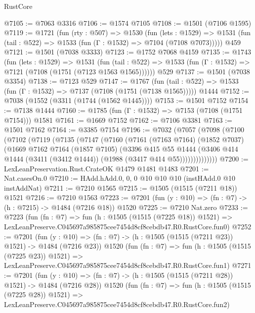 \begin{lexlean}{RustCore}
\begin{coremodule}
@7105 := @7063 @3316
@7106 := @1574 @7105
@7108 := @1501 (@7106 @1595)
@7119 := @1721
    (fun (rty : @507) =>
    @1530
      (fun (lets : @1529) =>
      @1531 (fun (tail : @522) => @1533 (fun (Γ : @1532) => @7104 (@7108 @7073)))))
    @459
@7121 := @1501 (@7038 @3333)
@7123 := @1752 @7068 @4159
@7135 := @1743
    (fun (lets : @1529) =>
    @1531
      (fun (tail : @522) => @1533 (fun (Γ : @1532) => @7121 (@7108 (@1751 (@7123 @1563 @1565))))))
    @529
@7137 := @1501 (@7038 @3354)
@7138 := @7123 @529
@7147 := @1767
    (fun (tail : @522) => @1533 (fun (Γ : @1532) => @7137 (@7108 (@1751 (@7138 @1565)))))
    @1444
@7152 := @7038 (@1552 (@3311 (@1744 (@1562 @1445))))
@7153 := @1501 @7152
@7154 := @7138 @1444
@7160 := @1785 (fun (Γ : @1532) => @7153 (@7108 (@1751 @7154))) @1581
@7161 := @1669 @7152
@7162 := @7106 @3381
@7163 := @1501 @7162
@7164 := @3385 @7154
@7196 := @7032
    (@7057
      (@7098
        (@7100
          (@7102
            (@7119
              (@7135
                (@7147
                  (@7160
                    (@7161
                      (@7163 @7164)
                      (@1852 @7037)
                      (@1669
                        @7162
                        @7164
                        (@1857 @7105)
                        (@3396
                          @415
                          @55
                          @1444
                          (@3406
                            @414
                            @1444
                            (@3411 (@3412 @1444))
                            (@1988 (@3417 @414 @55))))))))))))))
@7200 := LexLeanPreservation.Rust.CrateOK @1479 @1481 @1483
@7201 := Nat.casesOn.{0}
@7210 := HAdd.hAdd.{0, 0, 0} @10 @10 @10 (instHAdd.{0} @10 instAddNat)
@7211 := @7210 @1565
@7215 := @1505 (@1515 (@7211 @18)) @1521
@7216 := @7210 @1563
@7223 := @7201 (fun (y : @10) => (fn : @7) -> (h : @7215) -> @1484 (@7216 @18)) @1520
@7225 := @7210 Nat.zero
@7233 := @7223
    (fun (fn : @7) =>
    fun (h : @1505 (@1515 (@7225 @18)) @1521) =>
    LexLeanPreserve.C045697a985875cee7454d8cf8cebdb47.R0.RustCore.fun0)
@7252 := @7201
    (fun (y : @10) => (fn : @7) -> (h : @1505 (@1515 (@7211 @23)) @1521) -> @1484 (@7216 @23))
    @1520
    (fun (fn : @7) =>
    fun (h : @1505 (@1515 (@7225 @23)) @1521) =>
    LexLeanPreserve.C045697a985875cee7454d8cf8cebdb47.R0.RustCore.fun1)
@7271 := @7201
    (fun (y : @10) => (fn : @7) -> (h : @1505 (@1515 (@7211 @28)) @1521) -> @1484 (@7216 @28))
    @1520
    (fun (fn : @7) =>
    fun (h : @1505 (@1515 (@7225 @28)) @1521) =>
    LexLeanPreserve.C045697a985875cee7454d8cf8cebdb47.R0.RustCore.fun2)

\end{coremodule}
\end{lexlean}
